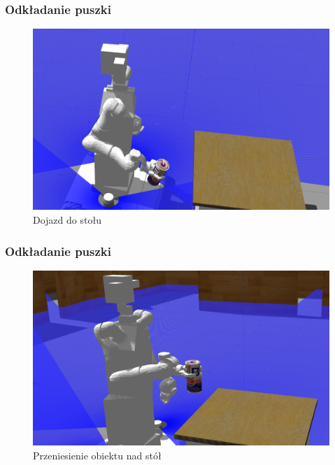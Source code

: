 \begin{frame}
	\frametitle{Odkładanie puszki}
	\begin{figure}[b]
        \label{sim_map}
        \centering
        \def\svgwidth{\columnwidth}
        \includegraphics[scale=0.3]{images/testpuszka/dojazd_do_celu.png}
        \caption{Dojazd do stołu}
    \end{figure}
\end{frame}

\addtocounter{framenumber}{-1}
\begin{frame}
	\frametitle{Odkładanie puszki}
	\begin{figure}[b]
        \label{sim_map}
        \centering
        \def\svgwidth{\columnwidth}
        \includegraphics[scale=0.25]{images/testpuszka/odkladanie_puszki_start.png}
        \caption{Przeniesienie obiektu nad stół}
    \end{figure}
\end{frame}

